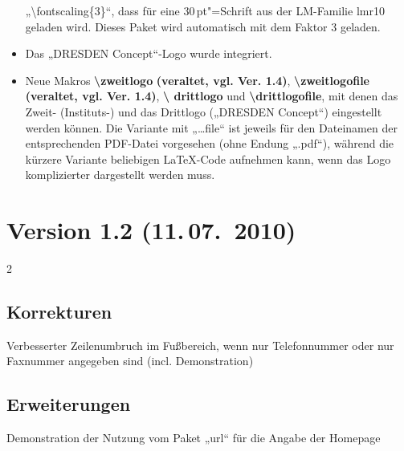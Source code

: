 \documentclass[a0paper,noDIN,MathematikA0]{tudmathposter}
\begin{document}
\begin{multicols}
\begin{itemize}
  „\textbackslash fontscaling\{3\}“, dass für eine $30$\,pt"=Schrift
  aus der LM-Familie lmr10 geladen wird. Dieses Paket wird automatisch
  mit dem Faktor 3 geladen.
\item Das „DRESDEN Concept“-Logo wurde integriert.
\item Neue Makros \textbf{\textbackslash zweitlogo} \textbf{(veraltet,
    vgl. Ver. 1.4)},
  \textbf{\textbackslash zweitlogofile} \textbf{(veraltet,
    vgl. Ver. 1.4)}, \textbf{\textbackslash
    drittlogo} und \textbf{\textbackslash drittlogofile}, mit denen
  das Zweit- (Instituts-) und das Drittlogo („DRESDEN Concept“)
  eingestellt werden können. Die Variante mit „\dots file“ ist jeweils
  für den Dateinamen der entsprechenden PDF-Datei vorgesehen (ohne
  Endung „.pdf“), während die kürzere Variante beliebigen LaTeX-Code
  aufnehmen kann, wenn das Logo komplizierter dargestellt werden muss.
\end{itemize}
\end{multicols}
\section{Version 1.2 (11.\,07.~2010)}
\begin{multicols}2
\subsection{Korrekturen}
Verbesserter Zeilenumbruch im Fußbereich, wenn nur Telefonnummer oder nur Faxnummer angegeben sind (incl. Demonstration)
\subsection{Erweiterungen}
Demonstration der Nutzung vom Paket „url“ für die Angabe der Homepage
\end{multicols}
\end{document}
